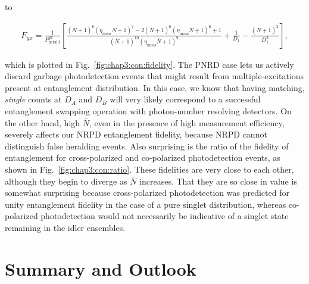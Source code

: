 \documentclass[aps,twocolumn,secnumarabic,amsmath,amssymb,pra,groupedaddress,
showpacs, showkeys]{revtex4-1}
\newcommand{\pna}[1]{\left(#1\right)}
\newcommand{\pnb}[1]{\left[#1\right]}
\begin{document}
to
\begin{widetext}
\begin{align}
    F_{yx}=\frac{1}{P_{\textrm{herald}}^{yx}}\pnb{\frac{(\bar{N}+1)^6 (\eta_{\textrm{meas}}  \bar{N}+1)^7-2 (\bar{N}+1)^6 (\eta_{\textrm{meas}}  \bar{N}+1)^6+1}{(\bar{N}+1)^{10} (\eta_{\textrm{meas}}  \bar{N}+1)^9} +\frac{1}{D_1}-\frac{\pna{\bar{N}+1}^2}{D_1^3}},
\end{align}
\end{widetext}
which is plotted in Fig.~\ref{fig:chap3:con:fidelity}. The PNRD case lets us
actively discard garbage photodetection events that might result from
multiple-excitations present at entanglement distribution. In this case, we
know that having matching, \emph{single} counts at $D_A$ and $D_B$ will very
likely correspond to a successful entanglement swapping operation with
photon-number resolving detectors. On the other hand, high $\bar{N}$, even in
the presence of high measurement efficiency, severely affects our NRPD
entanglement fidelity, because NRPD cannot distinguish false heralding
events. Also surprising is the ratio of the fidelity of entanglement for
cross-polarized and co-polarized photodetection events, as shown in
Fig.~\ref{fig:chap3:con:ratio}. These fidelities are very close to each other,
although they begin to diverge as $\bar{N}$ increases. That they are so close
in value is somewhat surprising because cross-polarized photodetection was
predicted for unity entanglement fidelity in the case of a pure singlet
distribution, whereas co-polarized photodetection would not necessarily be
indicative of a singlet state remaining in the idler ensembles.


\section{Summary and Outlook~\label{chap:conclusion}}
\end{document}
